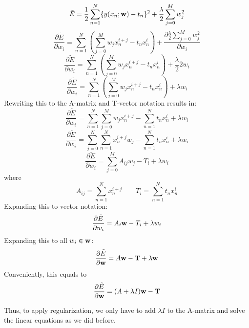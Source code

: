 \documentclass[paper=a4, fontsize=10pt]{scrartcl} %
\numberwithin{equation}{section} %
\numberwithin{figure}{section} %
\numberwithin{table}{section} %
\begin{document}
\begin{equation}
	\tilde{E} = \frac{1}{2}\sum_{n=1}^N \{y(x_n; \bold{w}) - t_n\}^2 + \frac{\lambda}{2}\sum_{j=0}^M w_j^2
\end{equation}
\begin{equation}
	\frac{\partial\tilde{E}}{\partial w_i} = \sum_{n=1}^N(\sum_{j=0}^M w_j x_n^{i+j} - t_n x_n^i) + \frac{\partial \frac{\lambda}{2}\sum_{j=0}^M w_j^2}{\partial w_i}
\end{equation}
\begin{equation}
	\frac{\partial\tilde{E}}{\partial w_i} = \sum_{n=1}^N(\sum_{j=0}^M w_j x_n^{i+j} - t_n x_n^i) + \frac{\lambda}{2} 2 w_i
\end{equation}
\begin{equation}
	\frac{\partial\tilde{E}}{\partial w_i} = \sum_{n=1}^N(\sum_{j=0}^M w_j x_n^{i+j} - t_n x_n^i) + \lambda w_i
\end{equation}
Rewriting this to the A-matrix and T-vector notation results in:
\begin{equation}
	\frac{\partial\tilde{E}}{\partial w_i} = \sum_{n=1}^N \sum_{j=0}^M w_j x_n^{i+j} - \sum_{n=1}^N t_n x_n^i + \lambda w_i
\end{equation}
\begin{equation}
	\frac{\partial\tilde{E}}{\partial w_i} = \sum_{j=0}^N \sum_{n=1}^N x_n^{i+j} w_j - \sum_{n=1}^N t_n x_n^i + \lambda w_i
\end{equation}
\begin{equation}
	\frac{\partial\tilde{E}}{\partial w_i} = \sum_{j=0}^M A_{ij}w_j - T_i + \lambda w_i
\end{equation}
where
\begin{equation}
	A_{ij} = \sum_{n=1}^N x_n^{i+j} \qquad
	T_i = \sum_{n=1}^N t_n x_n^i
\end{equation}
Expanding this to vector notation:
\begin{equation}
	\frac{\partial\tilde{E}}{\partial w_i} = A_i\bold{w} - T_i + \lambda w_i
\end{equation}
Expanding this to all $w_i \in \bold{w}$:
\begin{equation}
	\frac{\partial\tilde{E}}{\partial \bold{w}} = A\bold{w} - \bold{T} + \lambda \bold{w}
\end{equation}
Conveniently, this equals to
\begin{equation}
	\frac{\partial\tilde{E}}{\partial \bold{w}} = (A+\lambda I)\bold{w} - \bold{T}
\end{equation}

Thus, to apply regularization, we only have to add $\lambda I$ to the A-matrix and solve the linear equations as we did before.
\end{document}
